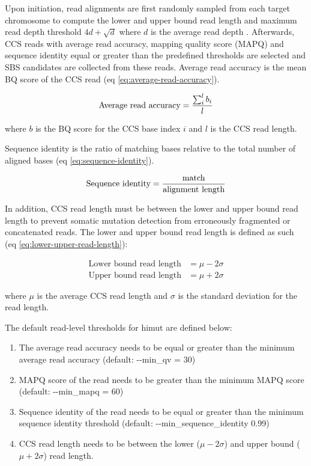 Upon initiation, read alignments are first randomly sampled from each target chromosome to compute the lower and upper bound read length and maximum read depth threshold $4d + \sqrt{d}$ where $d$ is the average read depth \cite{Li2014-ra}. Afterwards, CCS reads with average read accuracy, mapping quality score (MAPQ) and sequence identity equal or greater than the predefined thresholds are selected and SBS candidates are collected from these reads. Average read accuracy is the mean BQ score of the CCS read (eq \ref{eq:average-read-accuracy}).

\begin{equation} \label{eq:average-read-accuracy}
\text{Average read accuracy} = \frac{\sum^{l}_{i}b_{i}}{l} \smallskip
\end{equation}

where $b$ is the BQ score for the CCS base index $i$ and $l$ is the CCS read length.

Sequence identity is the ratio of matching bases relative to the total number of aligned bases (eq \ref{eq:sequence-identity}).  

\begin{equation} \label{eq:sequence-identity}
\text{Sequence identity} = \frac{\text{match}}{\text{alignment length}} \smallskip
\end{equation}

In addition, CCS read length must be between the lower and upper bound read length to prevent somatic mutation detection from erroneously fragmented or concatenated reads. The lower and upper bound read length is defined as such (eq \ref{eq:lower-upper-read-length}): 

\begin{equation}
\begin{aligned} 
\text{Lower bound read length} &= \mu - 2\sigma \\
\text{Upper bound read length} &= \mu + 2\sigma 
\end{aligned}
\label{eq:lower-upper-read-length}
\end{equation}

where $\mu$ is the average CCS read length and $\sigma$ is the standard deviation for the read length. 

The default read-level thresholds for himut are defined below:

\begin{enumerate}
\item The average read accuracy needs to be equal or greater than the minimum average read accuracy (default: -{}-min\_qv = 30)
\item MAPQ score of the read needs to be greater than the minimum MAPQ score (default: -{}-min\_mapq = 60)
\item Sequence identity of the read needs to be equal or greater than the minimum sequence identity threshold (default: -{}-min\_sequence\_identity 0.99)
\item CCS read length needs to be between the lower ($\mu - 2\sigma$) and upper bound ($\mu + 2\sigma$) read length.
\end{enumerate}

